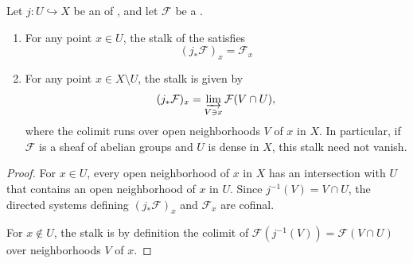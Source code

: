 \begin{proposition} \label{proposition:stalk_of_direct_image_under_open_embedding_on_topological_space}
    Let $j : U \hookrightarrow X$ be an  of , and let $\mathcal{F}$ be a .

    \begin{enumerate}
        \item For any point $x \in U$, the stalk of the  satisfies
        $$(j_*\mathcal{F})_x = \mathcal{F}_x$$

        \item For any point $x \in X \setminus U$, the stalk is given by
        $$(j_*\mathcal{F})_x = \varinjlim_{V \ni x} \mathcal{F}(V \cap U),$$
        where the colimit runs over open neighborhoods $V$ of $x$ in $X$. In particular, if $\mathcal{F}$ is a sheaf of abelian groups and $U$ is dense in $X$, this stalk need not vanish.
    \end{enumerate}
\end{proposition}
\begin{proof}
    For $x \in U$, every open neighborhood of $x$ in $X$ has an intersection with $U$ that contains an open neighborhood of $x$ in $U$. Since $j^{-1}(V) = V \cap U$, the directed systems defining $(j_*\mathcal{F})_x$ and $\mathcal{F}_x$ are cofinal.

    For $x \notin U$, the stalk is by definition the colimit of $\mathcal{F}(j^{-1}(V)) = \mathcal{F}(V \cap U)$ over neighborhoods $V$ of $x$.
\end{proof}
